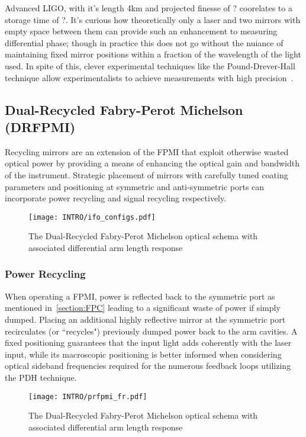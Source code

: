 Advanced LIGO, with it's length 4km and projected finesse of ? coorelates to a storage time of ?.
It's curious how theoretically only a laser and two mirrors with empty space between them can provide such an enhancement to measuring differential phase; though in practice this does not go without the nuiance of maintaining fixed mirror positions within a fraction of the wavelength of the light used. In spite of this, clever experimental techniques like the Pound-Drever-Hall technique allow experimentalists to achieve measurements with high precision~\cite{?}. 

\subsection{Dual-Recycled Fabry-Perot Michelson (DRFPMI)}
Recycling mirrors are an extension of the FPMI that exploit otherwise wasted optical power by providing a means of enhancing the optical gain and bandwidth of the instrument. Strategic placement of mirrors with carefully tuned coating parameters and positioning at symmetric and anti-symmetric ports can incorporate power recycling and signal recycling respectively.

\begin{figure}[H]
\begin{center}
\texttt{[image: INTRO/ifo\_configs.pdf]}
\end{center}
\caption{The Dual-Recycled Fabry-Perot Michelson optical schema with associated differential arm length response}
\label{fig:drfp_michelson}
\end{figure}

\subsubsection{Power Recycling}
When operating a FPMI, power is reflected back to the symmetric port as mentioned in~\ref{section:FPC} leading to a significant waste of power if simply dumped. Placing an additional highly reflective mirror at the symmetric port recirculates (or ``recycles") previously dumped power back to the arm cavities. A fixed positioning guarantees that the input light adds coherently with the laser input, while its macroscopic positioning is better informed when considering optical sideband frequencies required for the numerous feedback loops utilizing the PDH technique.

\begin{figure}[H]
\begin{center}
\texttt{[image: INTRO/prfpmi\_fr.pdf]}
\end{center}
\caption{The Dual-Recycled Fabry-Perot Michelson optical schema with associated differential arm length response}
\label{fig:drfp_michelson}
\end{figure}

